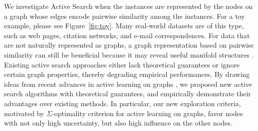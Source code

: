 We investigate Active Search when the instances are represented by the nodes on a graph whose edges encode pairwise similarity among the instances. 
For a toy example, please see Figure~\ref{fig:toy}.   
Many real-world datasets are of this type, such as web pages, citation networks, and e-mail correspondences. For 
data that are not naturally represented as graphs, %
a graph representation based on pairwise similarity 
can still be beneficial because it may reveal useful manifold structures \citep{tenenbaum2000global,belkin2001laplacian}.
Existing active search approaches \citep{wang2013active,roman,vanchinathanadaptively} either lack theoretical guarantees 
or ignore certain graph properties, thereby degrading empirical performances.  
By drawing ideas from recent advances in active learning on graphs \citep{ma_2013}, 
we proposed new active search algorithms with theoretical guarantees, and empirically demonstrate
their advantages over existing methods. In particular, our new exploration criteria, motivated by 
 $\Sigma$-optimality criterion \citep{ma_2013} for active learning on graphs, favor nodes with 
not only high uncertainty, but also high influence on the other nodes.     



\usetikzlibrary{arrows}

\usetikzlibrary{positioning}


\newcommand{\nodeDist}{0.8cm}

